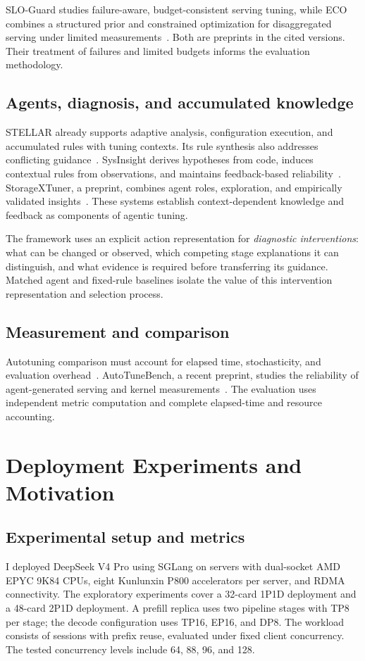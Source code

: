 \documentclass[preprint,12pt]{elsarticle}
\begin{document}
SLO-Guard studies failure-aware, budget-consistent serving tuning, while ECO combines a structured prior and constrained optimization for disaggregated serving under limited measurements~\cite{sloguard2026,ecotuning2026}. Both are preprints in the cited versions. Their treatment of failures and limited budgets informs the evaluation methodology.

\subsection{Agents, diagnosis, and accumulated knowledge}
STELLAR already supports adaptive analysis, configuration execution, and accumulated rules with tuning contexts. Its rule synthesis also addresses conflicting guidance~\cite{stellar2025}. SysInsight derives hypotheses from code, induces contextual rules from observations, and maintains feedback-based reliability~\cite{sysinsight2026}. StorageXTuner, a preprint, combines agent roles, exploration, and empirically validated insights~\cite{storagextuner2025}. These systems establish context-dependent knowledge and feedback as components of agentic tuning.

The framework uses an explicit action representation for \emph{diagnostic interventions}: what can be changed or observed, which competing stage explanations it can distinguish, and what evidence is required before transferring its guidance. Matched agent and fixed-rule baselines isolate the value of this intervention representation and selection process.

\subsection{Measurement and comparison}
Autotuning comparison must account for elapsed time, stochasticity, and evaluation overhead~\cite{methodology2024}. AutoTuneBench, a recent preprint, studies the reliability of agent-generated serving and kernel measurements~\cite{autotunebench2026}. The evaluation uses independent metric computation and complete elapsed-time and resource accounting.

\section{Deployment Experiments and Motivation}
\label{sec:historical}
\subsection{Experimental setup and metrics}
I deployed DeepSeek V4 Pro using SGLang on servers with dual-socket AMD EPYC 9K84 CPUs, eight Kunlunxin P800 accelerators per server, and RDMA connectivity. The exploratory experiments cover a 32-card 1P1D deployment and a 48-card 2P1D deployment. A prefill replica uses two pipeline stages with TP8 per stage; the decode configuration uses TP16, EP16, and DP8. The workload consists of sessions with prefix reuse, evaluated under fixed client concurrency. The tested concurrency levels include 64, 88, 96, and 128.
\end{document}
